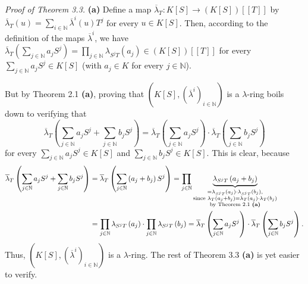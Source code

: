 \documentclass[12pt,final,notitlepage,onecolumn,german]{article}%
\begin{document}
\textit{Proof of Theorem 3.3.} \textbf{(a)} Define a map $\overline{\lambda
}_{T}:K\left[  S\right]  \rightarrow\left(  K\left[  S\right]  \right)
\left[  \left[  T\right]  \right]  $ by $\overline{\lambda}_{T}\left(
u\right)  =\sum\limits_{i\in\mathbb{N}}\overline{\lambda}^{i}\left(  u\right)
T^{j}$ for every $u\in K\left[  S\right]  $. Then, according to the definition
of the maps $\overline{\lambda}^{i}$, we have $\overline{\lambda}_{T}\left(
\sum\limits_{j\in\mathbb{N}}a_{j}S^{j}\right)  =\prod\limits_{j\in\mathbb{N}%
}\lambda_{S^{j}T}\left(  a_{j}\right)  \in\left(  K\left[  S\right]  \right)
\left[  \left[  T\right]  \right]  $ for every $\sum\limits_{j\in\mathbb{N}%
}a_{j}S^{j}\in K\left[  S\right]  $ (with $a_{j}\in K$ for every
$j\in\mathbb{N}$).

But by Theorem 2.1 \textbf{(a)}, proving that $\left(  K\left[  S\right]
,\left(  \overline{\lambda}^{i}\right)  _{i\in\mathbb{N}}\right)  $ is a
$\lambda$-ring boils down to verifying that%
\[
\overline{\lambda}_{T}\left(  \sum\limits_{j\in\mathbb{N}}a_{j}S^{j}%
+\sum\limits_{j\in\mathbb{N}}b_{j}S^{j}\right)  =\overline{\lambda}_{T}\left(
\sum\limits_{j\in\mathbb{N}}a_{j}S^{j}\right)  \cdot\overline{\lambda}%
_{T}\left(  \sum\limits_{j\in\mathbb{N}}b_{j}S^{j}\right)
\]
for every $\sum\limits_{j\in\mathbb{N}}a_{j}S^{j}\in K\left[  S\right]  $ and
$\sum\limits_{j\in\mathbb{N}}b_{j}S^{j}\in K\left[  S\right]  $. This is
clear, because%
\begin{align*}
\overline{\lambda}_{T}\left(  \sum\limits_{j\in\mathbb{N}}a_{j}S^{j}%
+\sum\limits_{j\in\mathbb{N}}b_{j}S^{j}\right)   &  =\overline{\lambda}%
_{T}\left(  \sum\limits_{j\in\mathbb{N}}\left(  a_{j}+b_{j}\right)
S^{j}\right)  =\prod\limits_{j\in\mathbb{N}}\underbrace{\lambda_{S^{j}%
T}\left(  a_{j}+b_{j}\right)  }_{\substack{=\lambda_{S^{j}T}\left(
a_{j}\right)  \cdot\lambda_{S^{j}T}\left(  b_{j}\right)  ,\\\text{since
}\lambda_{T}\left(  a_{j}+b_{j}\right)  =\lambda_{T}\left(  a_{j}\right)
\cdot\lambda_{T}\left(  b_{j}\right)  \\\text{by Theorem 2.1 \textbf{(a)}}}}\\
&  =\prod\limits_{j\in\mathbb{N}}\lambda_{S^{j}T}\left(  a_{j}\right)
\cdot\prod\limits_{j\in\mathbb{N}}\lambda_{S^{j}T}\left(  b_{j}\right)
=\overline{\lambda}_{T}\left(  \sum\limits_{j\in\mathbb{N}}a_{j}S^{j}\right)
\cdot\overline{\lambda}_{T}\left(  \sum\limits_{j\in\mathbb{N}}b_{j}%
S^{j}\right)  .
\end{align*}
Thus, $\left(  K\left[  S\right]  ,\left(  \overline{\lambda}^{i}\right)
_{i\in\mathbb{N}}\right)  $ is a $\lambda$-ring. The rest of Theorem 3.3
\textbf{(a)} is yet easier to verify.
\end{document}
